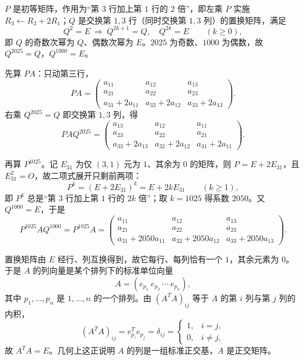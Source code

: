 \begin{solution}
$P$ 是初等矩阵，作用为“第 $3$ 行加上第 $1$ 行的 $2$ 倍”，即左乘 $P$ 实施 $R_3\leftarrow R_3+2R_1$；$Q$ 是交换第 $1,3$ 行（同时交换第 $1,3$ 列）的置换矩阵，满足
\[
Q^{2}=E\ \Longrightarrow\ Q^{2k+1}=Q,\quad Q^{2k}=E\qquad(k\ge0),
\]
即 $Q$ 的奇数次幂为 $Q$、偶数次幂为 $E$。$2025$ 为奇数、$1000$ 为偶数，故 $Q^{2025}=Q$，$Q^{1000}=E$。

先算 $PA$：只动第三行，
\[
PA=\begin{pmatrix}a_{11}&a_{12}&a_{13}\\a_{21}&a_{22}&a_{23}\\a_{31}+2a_{11}&a_{32}+2a_{12}&a_{33}+2a_{13}\end{pmatrix}.
\]
右乘 $Q^{2025}=Q$ 即交换第 $1,3$ 列，得
\[
PAQ^{2025}=\begin{pmatrix}a_{13}&a_{12}&a_{11}\\a_{23}&a_{22}&a_{21}\\a_{33}+2a_{13}&a_{32}+2a_{12}&a_{31}+2a_{11}\end{pmatrix}.
\]

再算 $P^{1025}$。记 $E_{31}$ 为仅 $(3,1)$ 元为 $1$、其余为 $0$ 的矩阵，则 $P=E+2E_{31}$，且 $E_{31}^{2}=O$，故二项式展开只剩前两项：
\[
P^{k}=(E+2E_{31})^{k}=E+2kE_{31}\qquad(k\ge1),
\]
即 $P^{k}$ 总是“第 $3$ 行加上第 $1$ 行的 $2k$ 倍”；取 $k=1025$ 得系数 $2050$。又 $Q^{1000}=E$，于是
\[
P^{1025}AQ^{1000}=P^{1025}A=\begin{pmatrix}a_{11}&a_{12}&a_{13}\\a_{21}&a_{22}&a_{23}\\a_{31}+2050a_{11}&a_{32}+2050a_{12}&a_{33}+2050a_{13}\end{pmatrix}.
\]
\end{solution}

\begin{solution}
置换矩阵由 $E$ 经行、列互换得到，故它每行、每列恰有一个 $1$，其余元素为 $0$。于是 $A$ 的列向量是某个排列下的标准单位向量
\[
A=(e_{p_1}\ e_{p_2}\ \cdots\ e_{p_n}),
\]
其中 $p_1,\dots,p_n$ 是 $1,\dots,n$ 的一个排列。由 $(A^{T}A)_{ij}$ 等于 $A$ 的第 $i$ 列与第 $j$ 列的内积，
\[
(A^{T}A)_{ij}=e_{p_i}^{T}e_{p_j}=\delta_{ij}
=\begin{cases}1,&i=j,\\0,&i\ne j,\end{cases}
\]
故 $A^{T}A=E$。几何上这正说明 $A$ 的列是一组标准正交基，$A$ 是正交矩阵。
\end{solution}

